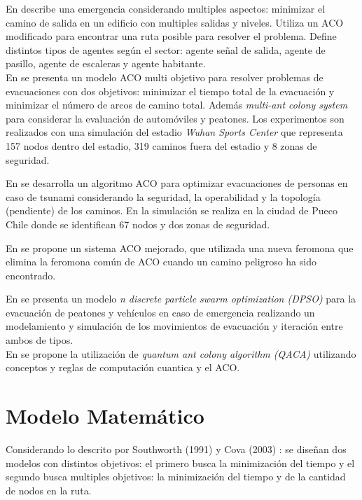 \documentclass[letter, 10pt]{article}
\begin{document}
En \cite{rahman2007feasible} describe una emergencia considerando multiples aspectos: minimizar el camino de salida en un edificio con multiples salidas y niveles. Utiliza un ACO modificado para encontrar una ruta posible para resolver el problema. Define distintos tipos de agentes según el sector: agente señal de salida, agente de pasillo, agente de escaleras y agente habitante.\\
En \cite{zong2010multi,zong2010multiflow} se presenta un modelo ACO multi objetivo para resolver problemas de evacuaciones con dos objetivos: minimizar el tiempo total de la evacuación y minimizar el número de arcos de camino total. Además \textit{multi-ant colony system} para considerar la evaluación de automóviles y peatones. Los experimentos son realizados con una simulación del estadio \textit{Wuhan Sports Center} que representa 157 nodos dentro del estadio, 319 caminos fuera del estadio y 8 zonas de seguridad.

En \cite{forcael2014ant} se desarrolla un algoritmo ACO para optimizar evacuaciones de personas en caso de tsunami considerando la seguridad, la operabilidad y la topología (pendiente) de los caminos. En la simulación se realiza en la ciudad de Pueco Chile donde se identifican 67 nodos y dos zonas de seguridad. 


En \cite{ohta2016improved} se propone un sistema ACO mejorado, que utilizada una nueva feromona que elimina la feromona común de ACO cuando un camino peligroso ha sido encontrado. 

En \cite{zong2014conflict} se presenta un modelo \textit{n discrete particle swarm optimization (DPSO)} para la evacuación de peatones y vehículos en caso de emergencia realizando un modelamiento y simulación de los movimientos de evacuación y iteración entre ambos de tipos.\\
En \cite{liu2016evacuation} se propone la utilización de \textit{quantum ant colony algorithm (QACA)} utilizando conceptos y reglas de computación cuantica y el ACO.
\section{Modelo Matem\'atico}
Considerando lo descrito por Southworth (1991) \cite{southworth1991regional} y Cova (2003) \cite{cova2003network}: se diseñan dos modelos con distintos objetivos: el primero busca la minimización del tiempo y el segundo busca multiples objetivos: la minimización del tiempo y de la cantidad de nodos en la ruta.
\end{document}
